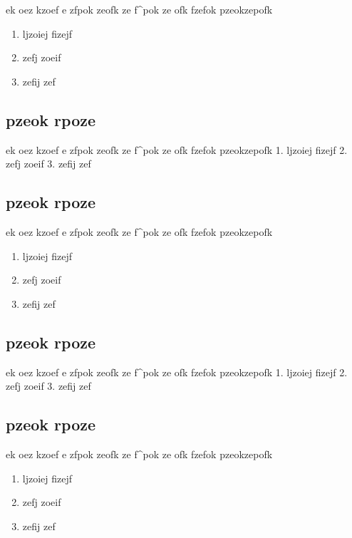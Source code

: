 \documentclass[
]{book}
\providecommand{\tightlist}{%
  \setlength{\itemsep}{0pt}\setlength{\parskip}{0pt}}
\def\tightlist{}
\begin{document}
\begin{blackbox}
ek oez kzoef
e zfpok zeofk
ze f\^{}pok ze ofk
fzefok pzeokzepofk

\begin{enumerate}
\def\labelenumi{\arabic{enumi}.}
\tightlist
\item
  ljzoiej fizejf
\item
  zefj zoeif
\item
  zefij zef
\end{enumerate}

\hypertarget{pzeok-rpoze-7}{%
\subsection{pzeok rpoze}\label{pzeok-rpoze-7}}

ek oez kzoef
e zfpok zeofk
ze f\^{}pok ze ofk
fzefok pzeokzepofk
1. ljzoiej fizejf
2. zefj zoeif
3. zefij zef

\hypertarget{pzeok-rpoze-8}{%
\subsection{pzeok rpoze}\label{pzeok-rpoze-8}}

ek oez kzoef
e zfpok zeofk
ze f\^{}pok ze ofk
fzefok pzeokzepofk

\begin{enumerate}
\def\labelenumi{\arabic{enumi}.}
\tightlist
\item
  ljzoiej fizejf
\item
  zefj zoeif
\item
  zefij zef
\end{enumerate}

\hypertarget{pzeok-rpoze-9}{%
\subsection{pzeok rpoze}\label{pzeok-rpoze-9}}

ek oez kzoef
e zfpok zeofk
ze f\^{}pok ze ofk
fzefok pzeokzepofk
1. ljzoiej fizejf
2. zefj zoeif
3. zefij zef

\hypertarget{pzeok-rpoze-10}{%
\subsection{pzeok rpoze}\label{pzeok-rpoze-10}}

ek oez kzoef
e zfpok zeofk
ze f\^{}pok ze ofk
fzefok pzeokzepofk

\begin{enumerate}
\def\labelenumi{\arabic{enumi}.}
\tightlist
\item
  ljzoiej fizejf
\item
  zefj zoeif
\item
  zefij zef
\end{enumerate}


\end{blackbox}
\end{document}
